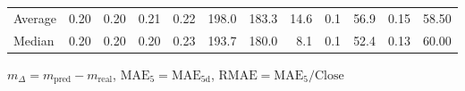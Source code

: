 \begin{threeparttable}
{\begin{tabular}{lrrrrrrrrrrr}
Average &          0.20 &          0.20 &          0.21 &        0.22 &               198.0 &               183.3 &       14.6 &                 0.1 &             56.9 &            0.15 &                  58.50 \\
 Median &          0.20 &          0.20 &          0.20 &        0.23 &               193.7 &               180.0 &        8.1 &                 0.1 &             52.4 &            0.13 &                  60.00 \\
\bottomrule
\end{tabular}
}
\begin{tablenotes}\footnotesize
\item $m_\Delta=m_{\text{pred}}-m_{\text{real}}$,
$\mathrm{MAE}_5=\mathrm{MAE}_{5\text{d}}$,
$\mathrm{RMAE}=\mathrm{MAE}_5/\text{Close}$
\end{tablenotes}
\end{threeparttable}
\endgroup

